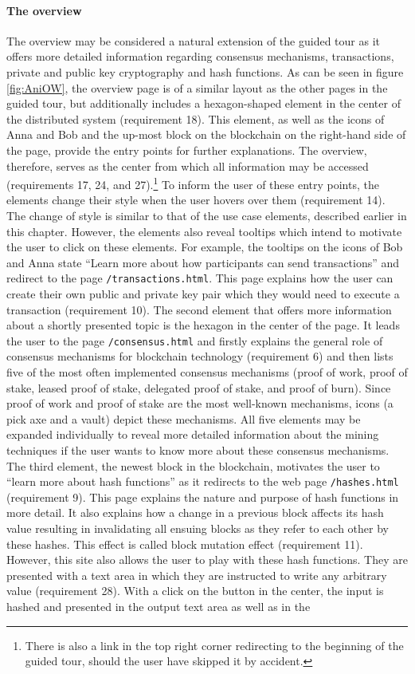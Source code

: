 \paragraph{The overview}
The overview may be considered a natural extension of the guided tour as it offers more detailed information regarding consensus mechanisms, transactions, private and public key cryptography and hash functions. As can be seen in figure \ref{fig:AniOW}, the overview page is of a similar layout as the other pages in the guided tour, but additionally includes a hexagon-shaped element in the center of the distributed system (requirement 18). This element, as well as the icons of Anna and Bob and the up-most block on the blockchain on the right-hand side of the page, provide the entry points for further explanations. The overview, therefore, serves as the center from which all information may be accessed (requirements 17, 24, and 27).\footnote{There is also a link in the top right corner redirecting to the beginning of the guided tour, should the user have skipped it by accident.} To inform the user of these entry points, the elements change their style when the user hovers over them (requirement 14). The change of style is similar to that of the use case elements, described earlier in this chapter. However, the elements also reveal tooltips which intend to motivate the user to click on these elements. For example, the tooltips on the icons of Bob and Anna state \enquote{Learn more about how participants can send transactions} and redirect to the page \texttt{/transactions.html}. This page explains how the user can create their own public and private key pair which they would need to execute a transaction (requirement 10). The second element that offers more information about a shortly presented topic is the hexagon in the center of the page. It leads the user to the page \texttt{/consensus.html} and firstly explains the general role of consensus mechanisms for blockchain technology (requirement 6) and then lists five of the most often implemented consensus mechanisms (proof of work, proof of stake, leased proof of stake, delegated proof of stake, and proof of burn). Since proof of work and proof of stake are the most well-known mechanisms, icons (a pick axe and a vault) depict these mechanisms. All five elements may be expanded individually to reveal more detailed information about the mining techniques if the user wants to know more about these consensus mechanisms. The third element, the newest block in the blockchain, motivates the user to \enquote{learn more about hash functions} as it redirects to the web page \texttt{/hashes.html} (requirement 9). This page explains the nature and purpose of hash functions in more detail. It also explains how a change in a previous block affects its hash value resulting in invalidating all ensuing blocks as they refer to each other by these hashes. This effect is called block mutation effect (requirement 11). However, this site also allows the user to play with these hash functions. They are presented with a text area in which they are instructed to write any arbitrary value (requirement 28). With a click on the button in the center, the input is hashed and presented in the output text area as well as in the 